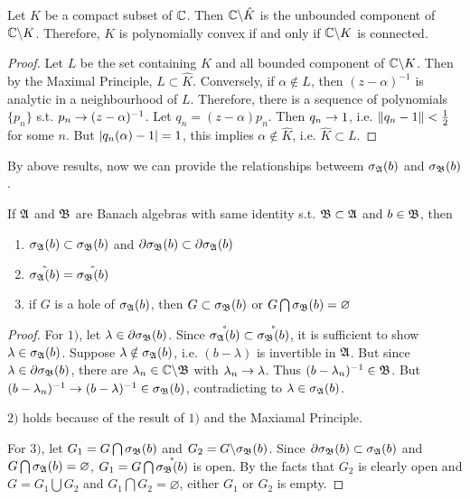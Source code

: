 \begin{prop}
	Let $K$ be a compact subset of $\mathbb{C}$. Then $\mathbb{C} \backslash \hat{K}$ is the unbounded component of $\mathbb{C} \backslash K$. Therefore, $K$ is polynomially convex if and only if $\mathbb{C} \backslash K$ is connected.
\end{prop}
\begin{proof}
	Let $L$ be the set containing $K$ and all bounded component of $\mathbb{C} \backslash K$. Then by the Maximal Principle, $L \subset \hat{K}$. Conversely, if $\alpha \notin L$, then $(z-\alpha)^{-1}$ is analytic in a neighbourhood of $L$. Therefore, there is a sequence of polynomials $\{p_n\}$ s.t. $p_n \rightarrow (z-\alpha)^{-1}$. Let $q_n=(z-\alpha)p_n$. Then $q_n \rightarrow 1$, i.e. $\left\lVert q_n-1\right\lVert < \frac{1}{2}$ for some $n$. But $\left\lvert q_n(\alpha)-1\right\lvert=1$, this implies $\alpha \notin \hat{K}$, i.e. $\hat{K} \subset L$.
\end{proof}

By above results, now we can provide the relationships betweem $\sigma_{\mathfrak{A}}(b)$ and $\sigma_{\mathfrak{B}}(b)$.

\begin{thm}
	If $\mathfrak{A}$ and $\mathfrak{B}$ are Banach algebras with same identity s.t. $\mathfrak{B} \subset \mathfrak{A}$ and $b \in \mathfrak{B}$, then
	\begin{enumerate}[label=\arabic*)]
		\item $\sigma_{\mathfrak{A}}(b) \subset \sigma_{\mathfrak{B}}(b)$ and $\partial\sigma_{\mathfrak{B}}(b) \subset \partial\sigma_{\mathfrak{A}}(b)$
		\item $\hat{\sigma_{\mathfrak{A}}(b)} = \hat{\sigma_{\mathfrak{B}}(b)}$
		\item if $G$ is a hole of $\sigma_{\mathfrak{A}}(b)$, then $G \subset \sigma_{\mathfrak{B}}(b)$ or $G \bigcap \sigma_{\mathfrak{B}}(b) = \varnothing$
	\end{enumerate}
\end{thm}
\begin{proof}
	\item For $1)$, let $\lambda \in \partial\sigma_{\mathfrak{B}}(b)$. Since $\mathring{\sigma_{\mathfrak{A}}(b)} \subset \mathring{\sigma_{\mathfrak{B}}(b)}$, it is sufficient to show $\lambda \in \sigma_{\mathfrak{A}}(b)$. Suppose $\lambda \notin \sigma_{\mathfrak{A}}(b)$, i.e. $(b-\lambda)$ is invertible in $\mathfrak{A}$. But since $\lambda \in \partial\sigma_{\mathfrak{B}}(b)$, there are $\lambda_n \in \mathbb{C} \backslash \mathfrak{B}$ with $\lambda_n \rightarrow \lambda$. Thus $(b-\lambda_n)^{-1} \in \mathfrak{B}$. But $(b-\lambda_n)^{-1} \rightarrow (b-\lambda)^{-1} \in \sigma_{\mathfrak{B}}(b)$, contradicting to $\lambda \in \sigma_{\mathfrak{A}}(b)$.
	\item $2)$ holds because of the result of $1)$ and the Maxiamal Principle.
	\item For $3)$, let $G_1 = G \bigcap \sigma_{\mathfrak{B}}(b)$ and $G_2 = G \backslash \sigma_{\mathfrak{B}}(b)$. Since $\partial\sigma_{\mathfrak{B}}(b) \subset \sigma_{\mathfrak{A}}(b)$ and $G \bigcap \sigma_{\mathfrak{A}}(b) = \varnothing$, $G_1 = G \bigcap \mathring{\sigma_{\mathfrak{B}}(b)}$ is open. By the facts that $G_2$ is clearly open and $G = G_1 \bigcup G_2$ and $G_1 \bigcap G_2 = \varnothing$, either $G_1$ or $G_2$ is empty.
\end{proof}

